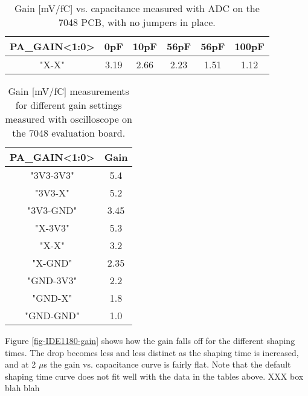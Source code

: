 \documentclass[../main/thesis.tex]{subfiles}
\begin{document}
\begin{table}[h!]
	\begin{center}
		\caption{Gain [mV/fC] vs. capacitance measured with ADC on the 7048 PCB, with no jumpers in place.}
		\label{tab-gain-adc-7048}
		\begin{tabular}{cccccc}\toprule
			\textbf{PA\_GAIN<1:0>} & \textbf{0pF}  & \textbf{10pF} & \textbf{56pF} & \textbf{56pF} & \textbf{100pF} \\ \midrule
			"X-X"     & 3.19 & 2.66  & 2.23  & 1.51 & 1.12   \\ \bottomrule
		\end{tabular}
	\end{center}
\end{table}

\begin{table}[h!]	%
	\begin{center}
		\caption{Gain [mV/fC] measurements for different gain settings measured with oscilloscope on the 7048 evaluation board.}
		\label{tab-gains-7048}
		\begin{tabular}{cc}\toprule
			\textbf{PA\_GAIN<1:0>} & \textbf{Gain}   \\ \midrule
			"3V3-3V3" & 5.4  \\
			"3V3-X" & 5.2  \\
			"3V3-GND" & 3.45 \\
			"X-3V3" & 5.3  \\
			"X-X" & 3.2  \\
			"X-GND" & 2.35 \\
			"GND-3V3" & 2.2  \\
			"GND-X" & 1.8  \\
			"GND-GND" & 1.0   \\ \bottomrule
		\end{tabular}
	\end{center}
\end{table}

Figure \ref{fig-IDE1180-gain} shows how the gain falls off for the different shaping times. The drop becomes less and less distinct as the shaping time is increased, and at 2 $\mu$s the gain vs. capacitance curve is fairly flat. Note that the default shaping time curve does not fit well with the data in the tables above. XXX box blah blah

\end{document}
